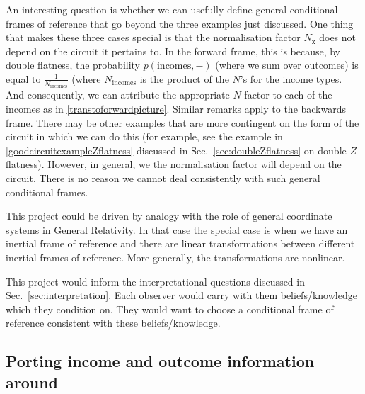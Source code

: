 \documentclass[10pt]{article}
\begin{document}
An interesting question is whether we can usefully define general conditional frames of reference that go beyond the three examples just discussed.  One thing that makes these three cases special is that the normalisation factor $N_\mathtt{x}$ does not depend on the circuit it pertains to.  In the forward frame, this is because, by double flatness, the probability $p(\text{incomes},-)$ (where we sum over outcomes) is equal to $\frac{1}{N_\text{incomes}}$ (where $N_\text{incomes}$ is the product of the $N$'s for the income types.  And consequently, we can attribute the appropriate $N$ factor to each of the incomes as in \eqref{transtoforwardpicture}. Similar remarks apply to the backwards frame.  There may be other examples that are more contingent on the form of the circuit in which we can do this (for example, see the example in \eqref{goodcircuitexampleZflatness} discussed in Sec.\ \ref{sec:doubleZflatness} on double $Z$-flatness).  However, in general, we the normalisation factor will depend on the circuit.  There is no reason we cannot deal consistently with such general conditional frames.

This project could be driven by analogy with the role of general coordinate systems in General Relativity. In that case the special case is when we have an inertial frame of reference and there are linear transformations between different inertial frames of reference. More generally, the transformations are nonlinear.

This project would inform the interpretational questions discussed in Sec.\ \ref{sec:interpretation}.  Each observer would carry with them beliefs/knowledge which they condition on. They would want to choose a conditional frame of reference consistent with these beliefs/knowledge.

\subsection{Porting income and outcome information around}\label{sec:portinginformationarround}
\end{document}
